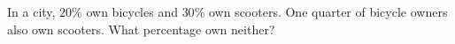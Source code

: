 In a city, $20\%$ own bicycles and $30\%$ own scooters. One quarter of bicycle owners also own scooters. What percentage own neither?
